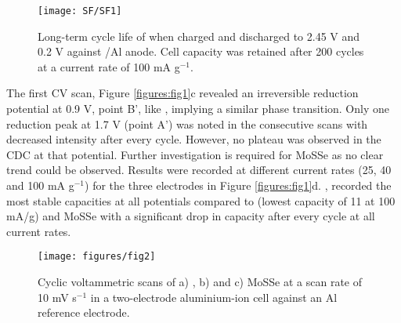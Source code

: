 \begin{figure}[htb!]
\centering
\texttt{[image: SF/SF1]}
\caption{Long-term cycle life of  when charged and discharged to 2.45 V and 0.2 V against /Al anode. Cell capacity was retained after 200 cycles at a current rate of 100 mA g$^{-1}$.}
\label{figures:SF1}
\end{figure}
The first CV scan, Figure \ref{figures:fig1}c revealed an irreversible reduction potential at 0.9 V, point B', like , implying a similar phase transition. Only one reduction peak at 1.7 V (point A') was noted in the consecutive scans with decreased intensity after every cycle. However, no plateau was observed in the CDC at that potential. Further investigation is required for MoSSe as no clear trend could be observed. Results were recorded at different current rates (25, 40 and 100 mA g$^{-1}$) for the three electrodes in Figure \ref{figures:fig1}d. , recorded the most stable capacities at all potentials compared to  (lowest capacity of 11 at 100 mA/g) and MoSSe with a significant drop in capacity after every cycle at all current rates. \begin{figure}[htb!]
\centering
\texttt{[image: figures/fig2]}
\caption{Cyclic voltammetric scans of a) , b)  and c) MoSSe at a scan rate of 10 mV s$^{-1}$ in a two-electrode aluminium-ion cell against an Al reference electrode.}
\label{figures:fig2}
\end{figure} 

